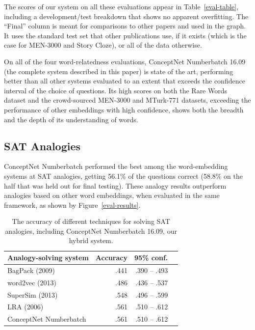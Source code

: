 \documentclass[letterpaper]{article}
\begin{document}
The scores of our system on all these evaluations appear in
Table~\ref{eval-table}, including a development/test breakdown that shows no
apparent overfitting. The ``Final'' column is meant for comparisons to other
papers and used in the graph. It uses the standard test set that other
publications use, if it exists (which is the case for MEN-3000 and Story
Cloze), or all of the data otherwise.

On all of the four word-relatedness evaluations, ConceptNet Numberbatch 16.09
(the complete system described in this paper) is state of the art, performing
better than all other systems evaluated to an extent that exceeds the
confidence interval of the choice of questions. Its high scores on both the
Rare Words dataset and the crowd-sourced MEN-3000 and MTurk-771 datasets,
exceeding the performance of other embeddings with high confidence, shows both
the breadth and the depth of its understanding of words.

\subsection{SAT Analogies}

ConceptNet Numberbatch performed the best among the word-embedding systems at
SAT analogies, getting 56.1\% of the questions correct (58.8\% on the half that
was held out for final testing).  These analogy results outperform analogies
based on other word embeddings, when evaluated in the same framework, as shown
by Figure~\ref{eval-results}.

\begin{table}[t]
\centering
\begin{tabular}{lrrr}
\bf Analogy-solving system   & \bf Accuracy & \bf 95\% conf. \\
\hline
    BagPack (2009)           & .441 & .390 -- .493 \\
    word2vec (2013)          & .486 & .436 -- .537 \\
    SuperSim (2013)          & .548 & .496 -- .599 \\
    LRA (2006)               & .561 & .510 -- .612 \\
    ConceptNet Numberbatch   & .561 & .510 -- .612
\end{tabular}
    \caption{The accuracy of different techniques for solving SAT analogies,
    including ConceptNet Numberbatch 16.09, our hybrid system.}
\label{analogy-eval-table}
\end{table}
\end{document}
